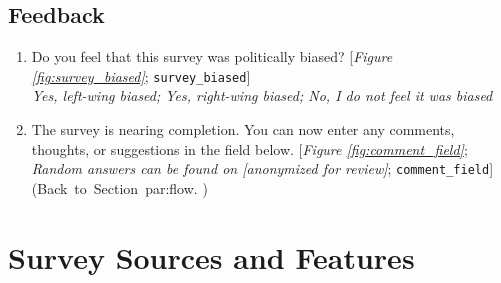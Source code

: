 \documentclass[12pt,english]{article}
\begin{document}
\begin{bibunit}
\begin{enumerate}[resume]
\end{enumerate} 

 \subsection*{Feedback} 
 \begin{enumerate}[resume] 
\item  \label{q:survey_biased} Do you feel that this survey was politically biased? [\textit{Figure \ref{fig:survey_biased}}; 
\verb|survey_biased|]
  \\ \textit{Yes, left-wing biased; Yes, right-wing biased; No, I do not feel it was biased}

\item  \label{q:comment_field} The survey is nearing completion. You can now enter any comments, thoughts, or suggestions in the field below. [\textit{Figure \ref{fig:comment_field}}; \textit{Random answers can be found on [anonymized for review]}; 
\verb|comment_field|] \hfill (Back~to~Section~{par:flow}.%
 )



 \end{enumerate} 



\clearpage
\section{Survey Sources and Features}\label{app:features}




\end{bibunit}
\end{document}
